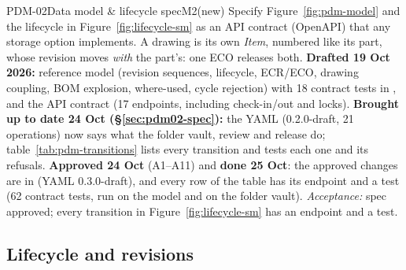 \begin{epic}{PDM-02}{Data model \& lifecycle spec}{M2}{\stDone}{(new)}
Specify Figure~\ref{fig:pdm-model} and the lifecycle in Figure~\ref{fig:lifecycle-sm} as an API contract
(OpenAPI) that any storage option implements. A drawing is its own \emph{Item}, numbered like its part, whose
revision moves \emph{with} the part's: one ECO releases both.
\textbf{Drafted 19 Oct 2026:} reference model  (revision sequences,
lifecycle, ECR/ECO, drawing coupling, BOM explosion, where-used, cycle rejection) with 18 contract tests in
, and the API contract  (17 endpoints,
including check-in/out and locks).
\textbf{Brought up to date 24 Oct (\S\ref{sec:pdm02-spec}):} the YAML (0.2.0-draft, 21 operations) now says what the
folder vault, review and release do; table~\ref{tab:pdm-transitions} lists every transition and
 tests each one and its refusals. \textbf{Approved 24 Oct} (A1--A11) and
\textbf{done 25 Oct}: the approved changes are in  (YAML 0.3.0-draft), and every row of the table has
its endpoint and a test (62 contract tests, run on the model and on the folder vault).
\emph{Acceptance:} spec approved; every transition in Figure~\ref{fig:lifecycle-sm} has an endpoint and a test.
\end{epic}

\subsection{Lifecycle and revisions}\label{sec:lifecycle}

